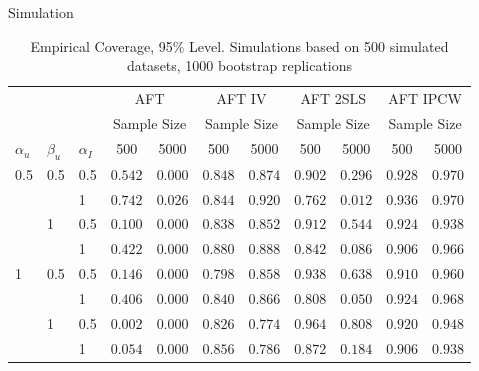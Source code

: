 \documentclass[final,plain]{beamer}
\newlength{\onecolwid}
\newlength{\twocolwid}
\begin{document}
\begin{frame}[t]
\begin{columns}[t]
\begin{column}{\twocolwid}
\begin{columns}[t]
\begin{column}{\onecolwid}
\begin{block}{\Large Simulation}
	\begin{table}\label{simulation}
\centering
\begin{tabular}{@{}lllccccccbb@{}}
\midrule
& & & \multicolumn{2}{c}{AFT} & \multicolumn{2}{c}{AFT IV} & \multicolumn{2}{c}{AFT 2SLS} & \multicolumn{2}{c}{AFT IPCW} \\ 
& & & \multicolumn{2}{c}{Sample Size} & \multicolumn{2}{c}{Sample Size} & \multicolumn{2}{c}{Sample Size} & \multicolumn{2}{c}{Sample Size} \\ 
$\alpha_u$ & $\beta_u$ & $\alpha_I$ & \multicolumn{1}{c}{500} & \multicolumn{1}{c}{5000} & \multicolumn{1}{c}{500} & \multicolumn{1}{c}{5000} & \multicolumn{1}{c}{500} & \multicolumn{1}{c}{5000} & \multicolumn{1}{c}{500} & \multicolumn{1}{c}{5000} \\ 
\midrule
0.5 & 0.5 & 0.5  & $0.542$ & $0.000$ & $0.848$ & $0.874$ & $0.902$ & $0.296$ & $0.928$ & $0.970$ \\
 &  & 1  & $0.742$ & $0.026$ & $0.844$ & $0.920$ & $0.762$ & $0.012$ & $0.936$ & $0.970$ \\
 & 1 & 0.5  & $0.100$ & $0.000$ & $0.838$ & $0.852$ & $0.912$ & $0.544$ & $0.924$ & $0.938$ \\
 &  & 1  & $0.422$ & $0.000$ & $0.880$ & $0.888$ & $0.842$ & $0.086$ & $0.906$ & $0.966$ \\
\midrule
1 & 0.5 & 0.5  & $0.146$ & $0.000$ & $0.798$ & $0.858$ & $0.938$ & $0.638$ & $0.910$ & $0.960$ \\
 &  & 1  & $0.406$ & $0.000$ & $0.840$ & $0.866$ & $0.808$ & $0.050$ & $0.924$ & $0.968$ \\
 & 1 & 0.5  & $0.002$ & $0.000$ & $0.826$ & $0.774$ & $0.964$ & $0.808$ & $0.920$ & $0.948$ \\
 &  & 1  & $0.054$ & $0.000$ & $0.856$ & $0.786$ & $0.872$ & $0.184$ & $0.906$ & $0.938$ \\
\bottomrule 
\end{tabular}
	\caption{Empirical Coverage, 95\% Level. Simulations based on 500 simulated datasets, 1000 bootstrap replications}
	\end{table}


\end{block}
\end{column}
\end{columns}
\end{column}
\end{columns}
\end{frame}
\end{document}
